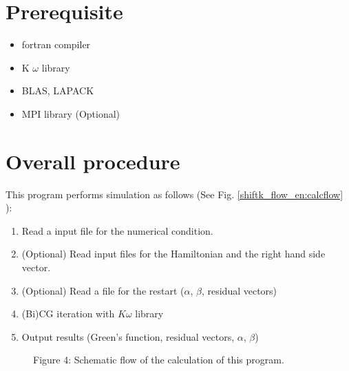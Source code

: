 \documentclass[letterpaper,10pt,dvipdfmx,openany,english]{sphinxmanual}
\begin{document}
\chapter{Prerequisite}
\label{\detokenize{shiftk_env_en:prerequisite}}\label{\detokenize{shiftk_env_en::doc}}\begin{itemize}
\item {} 
fortran compiler

\item {} 
K \(\omega\) library

\item {} 
BLAS, LAPACK

\item {} 
MPI library (Optional)

\end{itemize}


\chapter{Overall procedure}
\label{\detokenize{shiftk_flow_en:overall-procedure}}\label{\detokenize{shiftk_flow_en::doc}}
This program performs simulation as follows (See Fig. \ref{shiftk_flow_en:calcflow} ):
\begin{enumerate}
%
\item {} 
Read a input file for the numerical condition.

\item {} 
(Optional) Read input files for the Hamiltonian and the right hand side vector.

\item {} 
(Optional) Read a file for the restart (\(\alpha\), \(\beta\), residual vectors)

\item {} 
(Bi)CG iteration with \(K\omega\) library

\item {} 
Output results (Green’s function, residual vectors, \(\alpha\), \(\beta\))

\end{enumerate}

\begin{figure}[htbp]
\centering
\capstart

\noindent{}
\caption{Figure 4: Schematic flow of the calculation of this program.}\label{\detokenize{shiftk_flow_en:id6}}\label{\detokenize{shiftk_flow_en:calcflow}}\end{figure}
\end{document}
